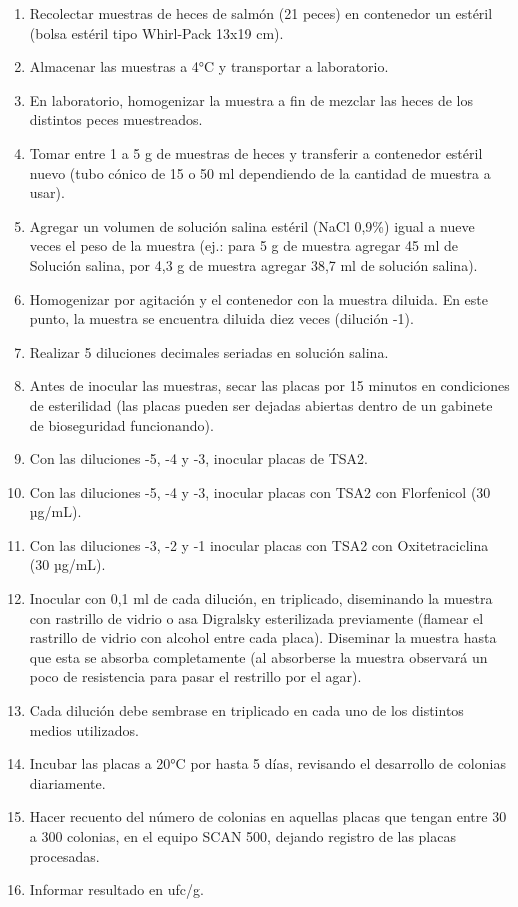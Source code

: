 \documentclass[
  letterpaper,
  DIV=11,
  numbers=noendperiod]{scrartcl}
\providecommand{\tightlist}{%
  \setlength{\itemsep}{0pt}\setlength{\parskip}{0pt}}\usepackage{longtable,booktabs,array}
\begin{document}
\begin{enumerate}
\def\labelenumi{\arabic{enumi}.}
\tightlist
\item
  Recolectar muestras de heces de salmón (21 peces) en contenedor un
  estéril (bolsa estéril tipo Whirl-Pack 13x19 cm).
\item
  Almacenar las muestras a 4°C y transportar a laboratorio.
\item
  En laboratorio, homogenizar la muestra a fin de mezclar las heces de
  los distintos peces muestreados.
\item
  Tomar entre 1 a 5 g de muestras de heces y transferir a contenedor
  estéril nuevo (tubo cónico de 15 o 50 ml dependiendo de la cantidad de
  muestra a usar).
\item
  Agregar un volumen de solución salina estéril (NaCl 0,9\%) igual a
  nueve veces el peso de la muestra (ej.: para 5 g de muestra agregar 45
  ml de Solución salina, por 4,3 g de muestra agregar 38,7 ml de
  solución salina).
\item
  Homogenizar por agitación y el contenedor con la muestra diluida. En
  este punto, la muestra se encuentra diluida diez veces (dilución -1).
\item
  Realizar 5 diluciones decimales seriadas en solución salina.
\item
  Antes de inocular las muestras, secar las placas por 15 minutos en
  condiciones de esterilidad (las placas pueden ser dejadas abiertas
  dentro de un gabinete de bioseguridad funcionando).
\item
  Con las diluciones -5, -4 y -3, inocular placas de TSA2.
\item
  Con las diluciones -5, -4 y -3, inocular placas con TSA2 con
  Florfenicol (30 µg/mL).
\item
  Con las diluciones -3, -2 y -1 inocular placas con TSA2 con
  Oxitetraciclina (30 µg/mL).
\item
  Inocular con 0,1 ml de cada dilución, en triplicado, diseminando la
  muestra con rastrillo de vidrio o asa Digralsky esterilizada
  previamente (flamear el rastrillo de vidrio con alcohol entre cada
  placa). Diseminar la muestra hasta que esta se absorba completamente
  (al absorberse la muestra observará un poco de resistencia para pasar
  el restrillo por el agar).
\item
  Cada dilución debe sembrase en triplicado en cada uno de los distintos
  medios utilizados.
\item
  Incubar las placas a 20°C por hasta 5 días, revisando el desarrollo de
  colonias diariamente.
\item
  Hacer recuento del número de colonias en aquellas placas que tengan
  entre 30 a 300 colonias, en el equipo SCAN 500, dejando registro de
  las placas procesadas.
\item
  Informar resultado en ufc/g.
\end{enumerate}
\end{document}

